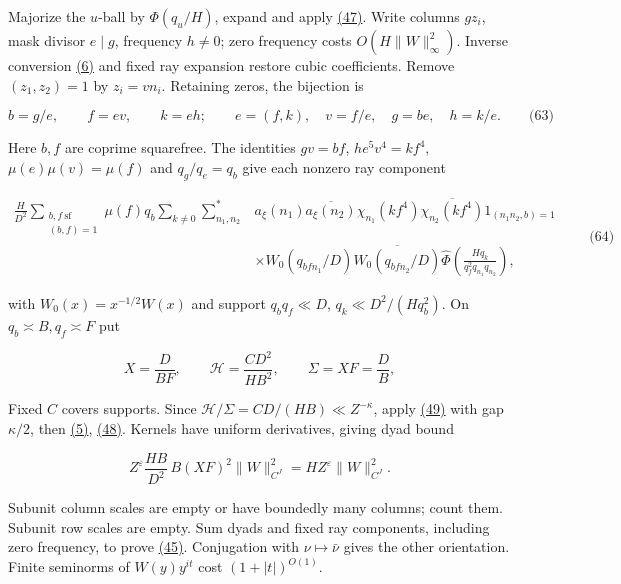 Majorize the \(u\)-ball by \(\Phi(q_u/H)\), expand and apply \protect\hyperlink{cf:eq:C.3}{(47)}. Write columns \(gz_i\), mask divisor \(e\mid g\), frequency \(h\ne0\); zero frequency costs \(O(H\|W\|_\infty^2)\). Inverse conversion \protect\hyperlink{cf:eq:A.1}{(6)} and fixed ray expansion restore cubic coefficients. Remove \((z_1,z_2)=1\) by \(z_i=vn_i\). Retaining zeros, the bijection is

\hypertarget{cf:eq:C.19}{}

\label{cf:eq:C.19}

\[
b=g/e,\qquad f=ev,\qquad k=eh;
\qquad e=(f,k),\quad v=f/e,\quad g=be,\quad h=k/e.
\qquad\text{(63)}
\]

Here \(b,f\) are coprime squarefree. The identities \(gv=bf\), \(he^5v^4=kf^4\), \(\mu(e)\mu(v)=\mu(f)\) and \(q_g/q_e=q_b\) give each nonzero ray component

\hypertarget{cf:eq:C.20}{}

\label{cf:eq:C.20}

\[
\begin{aligned}
\frac H{D^2}\sum_{\substack{b,f\ \mathrm{sf}\\(b,f)=1}}\mu(f)q_b
\sum_{k\ne0}\sum_{n_1,n_2}^{*}
&a_\xi(n_1)\overline{a_\xi(n_2)}
\chi_{n_1}(kf^4)\overline{\chi_{n_2}(kf^4)}1_{(n_1n_2,b)=1}\\
&\times W_0(q_{bfn_1}/D)\overline{W_0(q_{bfn_2}/D)}
\widehat\Phi\!\left(\frac{Hq_k}{q_f^2q_{n_1}q_{n_2}}\right),
\end{aligned}
\qquad\text{(64)}
\]

with \(W_0(x)=x^{-1/2}W(x)\) and support \(q_bq_f\ll D\), \(q_k\ll D^2/(Hq_b^2)\). On \(q_b\asymp B,q_f\asymp F\) put

\[
X=\frac D{BF},\qquad \mathcal H=\frac{C D^2}{HB^2},\qquad \Sigma=XF=\frac DB,
\]

Fixed \(C\) covers supports. Since \(\mathcal H/\Sigma=CD/(HB)\ll Z^{-\kappa}\), apply \protect\hyperlink{cf:eq:C.5}{(49)} with gap \(\kappa/2\), then \protect\hyperlink{cf:eq:1.4}{(5)}, \protect\hyperlink{cf:eq:C.4}{(48)}. Kernels have uniform derivatives, giving dyad bound

\[
Z^\varepsilon\frac{HB}{D^2}\,B(XF)^2\|W\|_{C^J}^2
=HZ^\varepsilon\|W\|_{C^J}^2.
\]

Subunit column scales are empty or have boundedly many columns; count them. Subunit row scales are empty. Sum dyads and fixed ray components, including zero frequency, to prove \protect\hyperlink{cf:eq:C.1}{(45)}. Conjugation with \(\nu\mapsto\bar\nu\) gives the other orientation. Finite seminorms of \(W(y)y^{it}\) cost \((1+|t|)^{O(1)}\).

